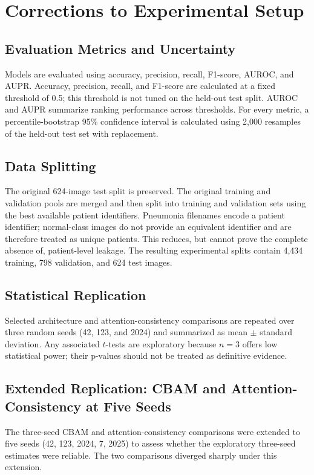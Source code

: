 \section{Corrections to Experimental Setup}

\subsection{Evaluation Metrics and Uncertainty}
Models are evaluated using accuracy, precision, recall, F1-score, AUROC, and
AUPR. Accuracy, precision, recall, and F1-score are calculated at a fixed
threshold of 0.5; this threshold is not tuned on the held-out test split. AUROC
and AUPR summarize ranking performance across thresholds. For every metric, a
percentile-bootstrap 95\% confidence interval is calculated using 2,000
resamples of the held-out test set with replacement.

\subsection{Data Splitting}
The original 624-image test split is preserved. The original training and
validation pools are merged and then split into training and validation sets
using the best available patient identifiers. Pneumonia filenames encode a
patient identifier; normal-class images do not provide an equivalent identifier
and are therefore treated as unique patients. This reduces, but cannot prove
the complete absence of, patient-level leakage. The resulting experimental
splits contain 4,434 training, 798 validation, and 624 test images.

\subsection{Statistical Replication}
Selected architecture and attention-consistency comparisons are repeated over
three random seeds (42, 123, and 2024) and summarized as mean $\pm$ standard
deviation. Any associated $t$-tests are exploratory because $n=3$ offers low
statistical power; their p-values should not be treated as definitive evidence.

\subsection{Extended Replication: CBAM and Attention-Consistency at Five Seeds}
\label{sec:five-seed}

The three-seed CBAM and attention-consistency comparisons were extended to
five seeds (42, 123, 2024, 7, 2025) to assess whether the exploratory
three-seed estimates were reliable. The two comparisons diverged sharply
under this extension.

